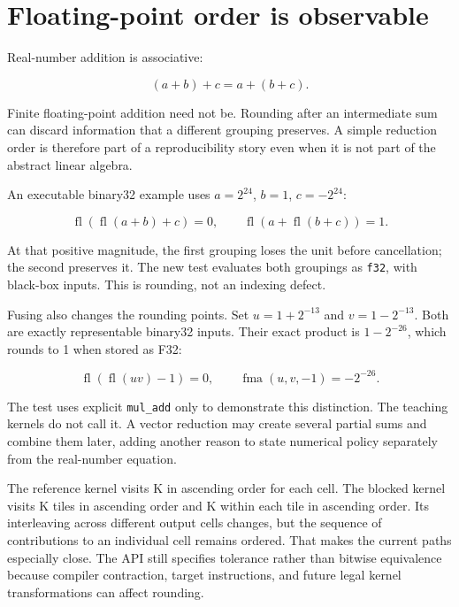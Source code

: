 \section{Floating-point order is
observable}\label{floating-point-order-is-observable}

Real-number addition is associative:

\begin{equation}
(a+b)+c=a+(b+c).
\end{equation}

Finite floating-point addition need not be. Rounding after an
intermediate sum can discard information that a different grouping
preserves. A simple reduction order is therefore part of a
reproducibility story even when it is not part of the abstract linear
algebra.

An executable binary32 example uses \(a=2^{24}\), \(b=1\),
\(c=-2^{24}\):

\begin{equation}
\operatorname{fl}(\operatorname{fl}(a+b)+c)=0,
\qquad
\operatorname{fl}(a+\operatorname{fl}(b+c))=1.
\end{equation}

At that positive magnitude, the first grouping loses the unit before
cancellation; the second preserves it. The new test evaluates both
groupings as \texttt{f32}, with black-box inputs. This is rounding, not
an indexing defect.

Fusing also changes the rounding points. Set \(u=1+2^{-13}\) and
\(v=1-2^{-13}\). Both are exactly representable binary32 inputs. Their
exact product is \(1-2^{-26}\), which rounds to 1 when stored as F32:

\begin{equation}
\operatorname{fl}(\operatorname{fl}(uv)-1)=0,
\qquad \operatorname{fma}(u,v,-1)=-2^{-26}.
\end{equation}

The test uses explicit \texttt{mul\_add} only to demonstrate this
distinction. The teaching kernels do not call it. A vector reduction may
create several partial sums and combine them later, adding another
reason to state numerical policy separately from the real-number
equation.

The reference kernel visits K in ascending order for each cell. The
blocked kernel visits K tiles in ascending order and K within each tile
in ascending order. Its interleaving across different output cells
changes, but the sequence of contributions to an individual cell remains
ordered. That makes the current paths especially close. The API still
specifies tolerance rather than bitwise equivalence because compiler
contraction, target instructions, and future legal kernel
transformations can affect rounding.

